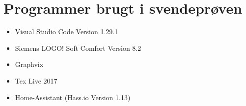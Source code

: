 \section{Programmer brugt i svendeprøven}
\begin{itemize}
    \item Visual Studio Code Version 1.29.1
    \item Siemens LOGO! Soft Comfort Version 8.2
    \item Graphvix
    \item Tex Live 2017
    \item Home-Assistant (Hass.io Version 1.13)
\end{itemize}
